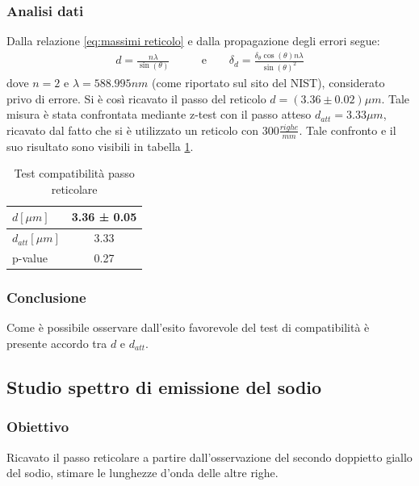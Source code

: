 \documentclass[a4paper]{article}
\begin{document}
\subsubsection{Analisi dati}
Dalla relazione \ref{eq:massimi reticolo} e dalla propagazione degli errori segue:
\begin{align}
    d = \frac{n\lambda}{\sin(\theta)}  \qquad & \text{e} \qquad \delta_d = \frac{\delta_{\theta}\cos(\theta)n\lambda}{\sin(\theta)^2}
\label{eq:passo_reticolo}
\end{align}
dove $n=2$ e $\lambda=588.995 nm$ (come riportato sul sito del NIST), considerato privo di errore.
Si è così ricavato il passo del reticolo $d=(3.36 \pm0.02)\mu m$. Tale misura è stata confrontata mediante z-test con il passo atteso $d_{att}=3.33 \mu m$, ricavato dal fatto che si è utilizzato un reticolo con $300 \frac{righe}{mm}$. 
Tale confronto e il suo risultato sono visibili in tabella \ref{tab:passo_reticolo+compatibilità}.

\begin{table}[htbp]
\centering
\begin{tabular}{|l|c|}
\hline
$d[\mu m]$ & 3.36 ± 0.05 \\\hline
$d_{att} [\mu m]$ & 3.33 \\\hline
p-value &  0.27 \\\hline
\end{tabular}
\caption{Test compatibilità passo reticolare}
\label{tab:passo_reticolo+compatibilità}
\end{table}

\subsubsection{Conclusione}
Come è possibile osservare dall'esito favorevole del test di compatibilità è presente accordo tra $d$ e $d_{att}$. 

\subsection{Studio spettro di emissione del sodio}
\subsubsection{Obiettivo}
Ricavato il passo reticolare a partire dall'osservazione del secondo doppietto giallo del sodio, stimare le lunghezze d'onda delle altre righe.
\end{document}
